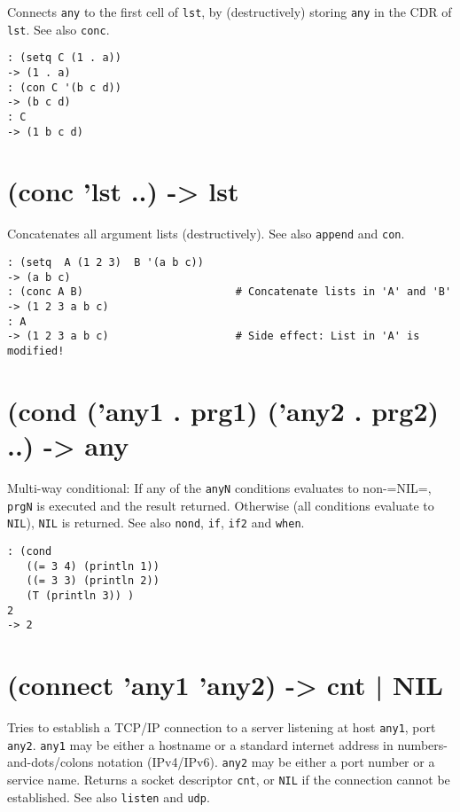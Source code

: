 {Connects \texttt{any} to the first cell of \texttt{lst}, by (destructively) storing
\texttt{any} in the CDR of \texttt{lst}. See also \texttt{conc}.


\begin{verbatim}
: (setq C (1 . a))
-> (1 . a)
: (con C '(b c d))
-> (b c d)
: C
-> (1 b c d)
\end{verbatim}

 
\section{(conc 'lst ..) -> lst}
\label{sec-8-1-3-30}


Concatenates all argument lists (destructively). See also \texttt{append} and
\texttt{con}.


\begin{verbatim}
: (setq  A (1 2 3)  B '(a b c))
-> (a b c)
: (conc A B)                        # Concatenate lists in 'A' and 'B'
-> (1 2 3 a b c)
: A
-> (1 2 3 a b c)                    # Side effect: List in 'A' is modified!
\end{verbatim}

 
\section{(cond ('any1 . prg1) ('any2 . prg2) ..) -> any}
\label{sec-8-1-3-31}


Multi-way conditional: If any of the \texttt{anyN} conditions evaluates to
non-=NIL=, \texttt{prgN} is executed and the result returned. Otherwise (all
conditions evaluate to \texttt{NIL}), \texttt{NIL} is returned. See also \texttt{nond}, \texttt{if},
\texttt{if2} and \texttt{when}.


\begin{verbatim}
: (cond
   ((= 3 4) (println 1))
   ((= 3 3) (println 2))
   (T (println 3)) )
2
-> 2
\end{verbatim}

 
\section{(connect 'any1 'any2) -> cnt | NIL}
\label{sec-8-1-3-32}


Tries to establish a TCP/IP connection to a server listening at host
\texttt{any1}, port \texttt{any2}. \texttt{any1} may be either a hostname or a standard
internet address in numbers-and-dots/colons notation (IPv4/IPv6). \texttt{any2}
may be either a port number or a service name. Returns a socket
descriptor \texttt{cnt}, or \texttt{NIL} if the connection cannot be established. See
also \texttt{listen} and \texttt{udp}.


}
